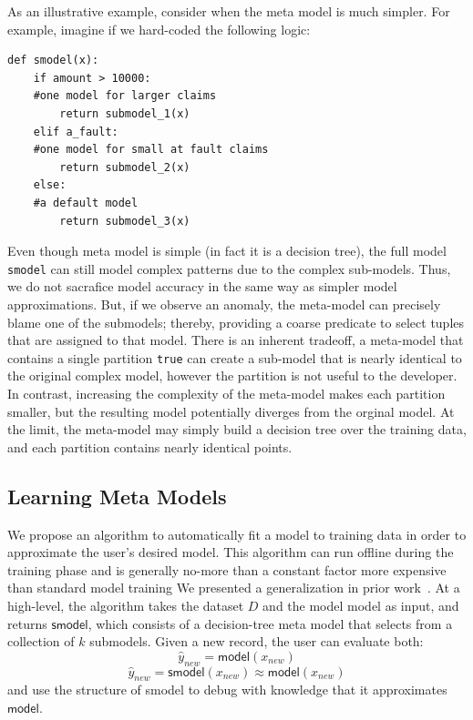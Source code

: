 As an illustrative example, consider when the meta model is much simpler.
For example, imagine if we hard-coded the following logic:
\begin{lstlisting}
def smodel(x):
    if amount > 10000:
    #one model for larger claims
        return submodel_1(x)
    elif a_fault:
    #one model for small at fault claims
        return submodel_2(x)
    else:
    #a default model
        return submodel_3(x)
\end{lstlisting}
Even though meta model is simple (in fact it is a decision tree), the full model \texttt{smodel} can still model complex patterns due to the complex sub-models.  Thus, we do not sacrafice model accuracy in the same way as simpler model approximations.
But, if we observe an anomaly, the meta-model can precisely blame one of the submodels; thereby, providing a coarse predicate to select tuples that are assigned to that model.
There is an inherent tradeoff, a meta-model that contains a single partition \texttt{true} can create a sub-model that is nearly identical to the original complex model, however the partition is not useful to the developer.  In contrast, increasing the complexity of the meta-model makes each partition smaller, but the resulting model potentially diverges from the orginal model.  At the limit, the meta-model may simply build a decision tree over the training data, and each partition contains nearly identical points.

\subsection{Learning Meta Models} 
We propose an algorithm to automatically fit a \sys model to training data in order to approximate the user's desired model.
This algorithm can run offline during the training phase and is generally no-more than a constant factor more expensive than standard model training
We presented a generalization in prior work~\cite{DBLP:journals/corr/KrishnanGLMPG16, krishnan17}. 
At a high-level, the algorithm takes the dataset $D$ and the model \textsf{model} as input, and returns $\textsf{smodel}$, which consists of a decision-tree meta model that selects from a collection of $k$ submodels. Given a new record, the user can evaluate both:
\[
\hat{y}_{new} = \textsf{model}(x_{new})
\]
\[
\hat{y}_{new} = \textsf{smodel}(x_{new}) \approx \textsf{model}(x_{new})
\]
and use the structure of \textsf{smodel} to debug with knowledge that it approximates $\textsf{model}$.

